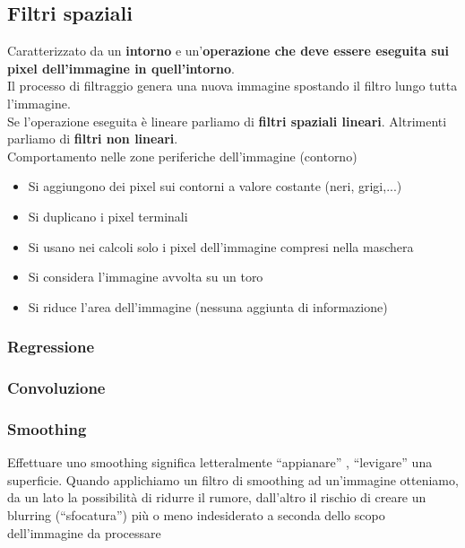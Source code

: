 \documentclass[12pt]{article}
\begin{document}
\subsection{Filtri spaziali}
Caratterizzato da un \textbf{intorno} e un'\textbf{operazione che deve essere eseguita sui pixel dell'immagine in quell'intorno}.\\
Il processo di filtraggio genera una nuova immagine spostando il filtro lungo tutta l'immagine.\\
Se l'operazione eseguita è lineare parliamo di \textbf{filtri spaziali lineari}. Altrimenti parliamo di \textbf{filtri non lineari}.\\
Comportamento nelle zone periferiche dell’immagine (contorno)
\begin{itemize}
    \item Si aggiungono dei pixel sui contorni a valore costante (neri, grigi,...)
    \item Si duplicano i pixel terminali
    \item Si usano nei calcoli solo i pixel dell’immagine compresi nella maschera
    \item Si considera l’immagine avvolta su un toro
    \item Si riduce l’area dell’immagine (nessuna aggiunta di informazione)
\end{itemize}

\subsubsection{Regressione}
\subsubsection{Convoluzione}
\subsubsection{Smoothing}
Effettuare uno smoothing significa letteralmente “appianare” , “levigare” una superficie. Quando applichiamo un filtro di smoothing ad un’immagine otteniamo, da un lato la possibilità di ridurre il rumore, dall’altro il rischio di creare un blurring (“sfocatura”) più o meno indesiderato a seconda dello scopo dell’immagine da processare
\newpage
\end{document}
